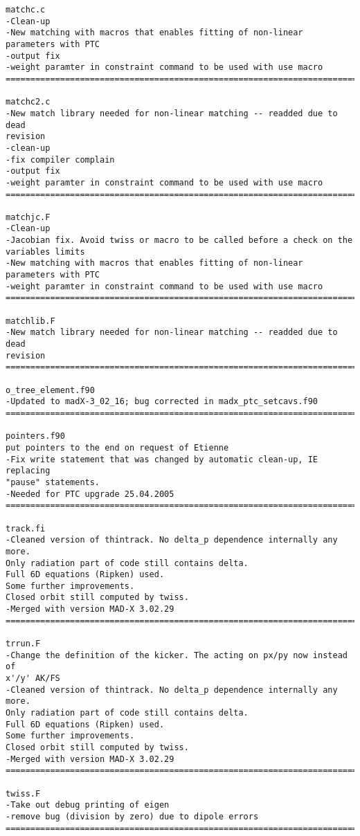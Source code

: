 \begin{verbatim}
matchc.c
-Clean-up
-New matching with macros that enables fitting of non-linear parameters with PTC
-output fix
-weight paramter in constraint command to be used with use macro
=============================================================================

matchc2.c
-New match library needed for non-linear matching -- readded due to dead
revision
-clean-up
-fix compiler complain
-output fix
-weight paramter in constraint command to be used with use macro
=============================================================================

matchjc.F
-Clean-up
-Jacobian fix. Avoid twiss or macro to be called before a check on the variables limits
-New matching with macros that enables fitting of non-linear parameters with PTC
-weight paramter in constraint command to be used with use macro
=============================================================================

matchlib.F
-New match library needed for non-linear matching -- readded due to dead
revision
=============================================================================

o_tree_element.f90
-Updated to madX-3_02_16; bug corrected in madx_ptc_setcavs.f90
=============================================================================

pointers.f90
put pointers to the end on request of Etienne
-Fix write statement that was changed by automatic clean-up, IE replacing
"pause" statements.
-Needed for PTC upgrade 25.04.2005
=============================================================================

track.fi
-Cleaned version of thintrack. No delta_p dependence internally any more.
Only radiation part of code still contains delta.
Full 6D equations (Ripken) used.
Some further improvements.
Closed orbit still computed by twiss.
-Merged with version MAD-X 3.02.29
=============================================================================

trrun.F
-Change the definition of the kicker. The acting on px/py now instead of
x'/y' AK/FS
-Cleaned version of thintrack. No delta_p dependence internally any more.
Only radiation part of code still contains delta.
Full 6D equations (Ripken) used.
Some further improvements.
Closed orbit still computed by twiss.
-Merged with version MAD-X 3.02.29
=============================================================================

twiss.F
-Take out debug printing of eigen
-remove bug (division by zero) due to dipole errors
=============================================================================


\end{verbatim}
